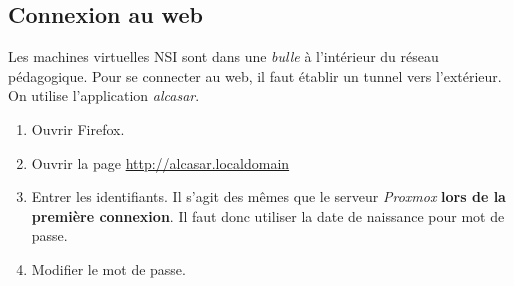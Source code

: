 \documentclass[a4paper,11pt]{article}
\begin{document}
\subsection{Connexion au web}
Les machines virtuelles NSI sont dans une \emph{bulle} à l'intérieur du réseau pédagogique. Pour se connecter au web, il faut établir un tunnel vers l'extérieur. On utilise l'application \emph{alcasar}.
\begin{activite}
\begin{enumerate}
    \item Ouvrir Firefox.
    \item Ouvrir la page \url{http://alcasar.localdomain}
    \item Entrer les identifiants. Il s'agit des mêmes que le serveur \emph{Proxmox} \textbf{lors de la première connexion}. Il faut donc utiliser la date de naissance pour mot de passe.
    \item Modifier le mot de passe. 
    \begin{center}
    \end{center}
\end{enumerate}
\end{activite}
\end{document}
